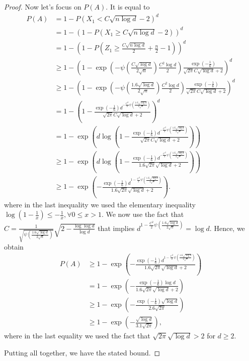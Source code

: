 \documentclass{article} %
\begin{document}
\begin{proof}
Now let's focus on $P(A)$. It is equal to
\begin{align*}
P(A) 
&= 1-P(X_1 < C \sqrt{n \log d}-2)^d \\
&= 1-(1-P(X_1\geq C \sqrt{n \log d}-2))^d \\
&= 1-(1-P(Z_1\geq \frac{C \sqrt{n \log d}}{2} +\frac{n}{2}-1))^d \\
&\geq 1-\left(1-\exp\left(- \psi\left(\frac{C \sqrt{\log d}}{2 \sqrt{n}}\right) \frac{C^2 \log d}{2}\right) \frac{\exp\left(-\frac{1}{6}\right)}{\sqrt{2\pi}C \sqrt{\log d}+2}\right)^d \\
&\geq 1-\left(1-\exp\left(- \psi\left(\frac{1.6 \sqrt{\log d}}{2 \sqrt{n}}\right) \frac{C^2 \log d}{2}\right) \frac{\exp\left(-\frac{1}{6}\right)}{\sqrt{2\pi}C \sqrt{\log d}+2}\right)^d \\
&= 1-\left(1-\frac{\exp\left(-\frac{1}{6}\right) d^{-\frac{C^2}{2} \psi\left(\frac{1.6 \sqrt{\log d}}{2 \sqrt{n}}\right)}}{\sqrt{2\pi}C \sqrt{\log d}+2}\right)^d \\
&= 1- \exp\left(d \log\left(1-\frac{\exp\left(-\frac{1}{6}\right) d^{-\frac{C^2}{2} \psi\left(\frac{1.6 \sqrt{\log d}}{2 \sqrt{n}}\right)}}{\sqrt{2\pi}C \sqrt{\log d}+2}\right)\right) \\
&\geq 1- \exp\left(d \log\left(1-\frac{\exp\left(-\frac{1}{6}\right) d^{-\frac{C^2}{2} \psi\left(\frac{1.6 \sqrt{\log d}}{2 \sqrt{n}}\right)}}{1.6 \sqrt{2\pi} \sqrt{\log d}+2}\right)\right) \\
&\geq 1 - \exp\left(-\frac{\exp\left(-\frac{1}{6}\right) d^{1-\frac{C^2}{2} \psi\left(\frac{1.6 \sqrt{\log d}}{2 \sqrt{n}}\right)}}{1.6 \sqrt{2\pi} \sqrt{\log d}+2}\right).
\end{align*}
where in the last inequality we used the elementary inequality $\log(1-\frac{1}{x}) \leq -\frac{1}{x}, \forall  0\leq x>1$.
We now use the fact that $C=\frac{1}{\sqrt{\psi\left(\frac{1.6 \sqrt{\log d}}{2 \sqrt{n}}\right)}}\sqrt{2- \frac{\log \log d}{\log d}}$ that implies $d^{1-\frac{C^2}{2} \psi\left(\frac{1.6 \sqrt{\log d}}{2 \sqrt{n}}\right)}=\log d$. Hence, we obtain
\begin{align*}
P(A) 
& \geq 1 - \exp\left(-\frac{\exp\left(-\frac{1}{6}\right) d^{1-\frac{C^2}{2} \psi\left(\frac{1.6 \sqrt{\log d}}{2 \sqrt{n}}\right)}}{1.6 \sqrt{2\pi} \sqrt{\log d}+2}\right) \\
& = 1 - \exp\left(-\frac{\exp\left(-\frac{1}{6}\right) \log d}{1.6 \sqrt{2\pi} \sqrt{\log d}+2}\right) \\
& \geq 1 - \exp\left(-\frac{\exp\left(-\frac{1}{6}\right) \sqrt{\log d}}{2.6 \sqrt{2\pi}}\right)\\
& \geq 1 - \exp\left(-\frac{\sqrt{\log d}}{3.1 \sqrt{2\pi}}\right),
\end{align*}
where in the last equality we used the fact that $\sqrt{2\pi} \sqrt{\log d} > 2$ for $d\geq 2$.

Putting all together, we have the stated bound.
\end{proof}
\end{document}
